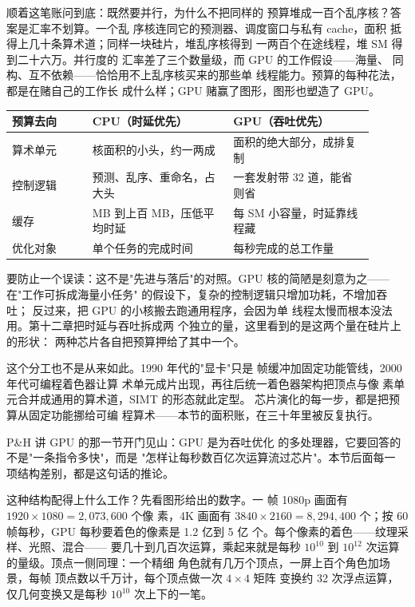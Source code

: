 顺着这笔账问到底：既然要并行，为什么不把同样的
预算堆成一百个乱序核？答案是汇率不划算。一个乱
序核连同它的预测器、调度窗口与私有 cache，面积
抵得上几十条算术道；同样一块硅片，堆乱序核得到
一两百个在途线程，堆 SM 得到二十六万。并行度的
汇率差了三个数量级，而 GPU 的工作假设——海量、
同构、互不依赖——恰恰用不上乱序核买来的那些单
线程能力。预算的每种花法，都是在赌自己的工作长
成什么样；GPU 赌赢了图形，图形也塑造了 GPU。

\begin{longtable}{L{0.2\linewidth}L{0.35\linewidth}L{0.35\linewidth}}
\toprule
预算去向 & CPU（时延优先） & GPU（吞吐优先） \\
\midrule
算术单元 & 核面积的小头，约一两成 & 面积的绝大部分，成排复制 \\
控制逻辑 & 预测、乱序、重命名，占大头 & 一套发射带 32 道，能省则省 \\
缓存 & MB 到上百 MB，压低平均时延 & 每 SM 小容量，时延靠线程藏 \\
优化对象 & 单个任务的完成时间 & 每秒完成的总工作量 \\
\bottomrule
\end{longtable}

要防止一个误读：这不是"先进与落后"的对照。GPU
核的简陋是刻意为之——在"工作可拆成海量小任务"
的假设下，复杂的控制逻辑只增加功耗，不增加吞吐；
反过来，把 GPU 的小核搬去跑通用程序，会因为单
线程太慢而根本没法用。第十二章把时延与吞吐拆成两
个独立的量，这里看到的是这两个量在硅片上的形状：
两种芯片各自把预算押给了其中一个。

这个分工也不是从来如此。1990 年代的"显卡"只是
帧缓冲加固定功能管线，2000 年代可编程着色器让算
术单元成片出现，再往后统一着色器架构把顶点与像
素单元合并成通用的算术道，SIMT 的形态就此定型。
芯片演化的每一步，都是把预算从固定功能挪给可编
程算术——本节的面积账，在三十年里被反复执行。

\begin{classicnote}
P\&H 讲 GPU 的那一节开门见山：GPU 是为吞吐优化
的多处理器，它要回答的不是"一条指令多快"，而是
"怎样让每秒数百亿次运算流过芯片"。本节后面每一
项结构差别，都是这句话的推论。
\end{classicnote}

这种结构配得上什么工作？先看图形给出的数字。一
帧 1080p 画面有 $1920\times1080=2,073,600$ 个像
素，4K 画面有 $3840\times2160=8,294,400$ 个；按
60 帧每秒，GPU 每秒要着色的像素是 1.2 亿到 5 亿
个。每个像素的着色——纹理采样、光照、混合——
要几十到几百次运算，乘起来就是每秒 $10^{10}$ 到
$10^{12}$ 次运算的量级。顶点一侧同理：一个精细
角色就有几万个顶点，一屏上百个角色加场景，每帧
顶点数以千万计，每个顶点做一次 $4\times4$ 矩阵
变换约 32 次浮点运算，仅几何变换又是每秒
$10^{10}$ 次上下的一笔。

